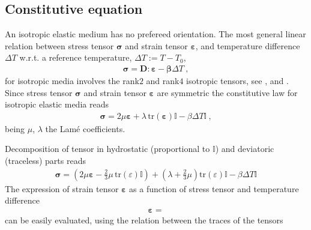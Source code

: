 \documentclass[letterpaper,10pt,english]{jupyterBook}
\begin{document}
\subsection{Constitutive equation}
\label{\detokenize{ch/solids/small-displacements-statics:constitutive-equation}}\label{\detokenize{ch/solids/small-displacements-statics:solid-mechanics-intro-small-displacements-statics-elastic-medium-constitutive-equation}}
\sphinxAtStartPar
An isotropic elastic medium has no prefereed orientation. The most general linear relation between stress tensor \(\symbf{\sigma}\) and strain tensor \(\symbf{\varepsilon}\), and temperature difference \(\Delta T\) w.r.t. a reference temperature, \(\Delta T := T - T_0\),
\begin{equation*}
\begin{split}\symbf{\sigma} = \mathbf{D} : \symbf{\varepsilon} - \symbf{\beta} \Delta T \ ,\end{split}
\end{equation*}
\sphinxAtStartPar
for isotropic media involves the rank\sphinxhyphen{}\(2\) and rank\sphinxhyphen{}\(4\) isotropic tensors, see , and . Since stress tensor \(\symbf{\sigma}\) and strain tensor \(\symbf{\varepsilon}\) are symmetric the constitutive law for isotropic elastic media reads
\begin{equation}\label{equation:ch/solids/small-displacements-statics:eq:linear-isotropic-elastic}
\begin{split}\symbf{\sigma} = 2 \mu \symbf{\varepsilon} + \lambda \, \text{tr}(\symbf{\varepsilon}) \mathbb{I} - \beta \Delta T \mathbb{I} \ ,\end{split}
\end{equation}
\sphinxAtStartPar
being \(\mu\), \(\lambda\) the Lamé coefficients.

\sphinxAtStartPar
Decomposition of tensor in hydrostatic (proportional to \(\mathbb{I}\)) and deviatoric (traceless) parts reads
\begin{equation}\label{equation:ch/solids/small-displacements-statics:eq:linear-isotropic-elastic:iso-dev}
\begin{split}\symbf{\sigma} = \left( 2 \mu \symbf{\varepsilon} - \frac{2}{3} \mu \, \text{tr}(\varepsilon) \mathbb{I} \right) + \left( \lambda + \frac{2}{3} \mu \right)\text{tr}(\varepsilon) \mathbb{I} - \beta \Delta T \mathbb{I} \end{split}
\end{equation}
\sphinxAtStartPar
The expression of strain tensor \(\symbf{\varepsilon}\) as a function of stress tensor and temperature difference
\begin{equation*}
\begin{split}\symbf{\varepsilon} = \end{split}
\end{equation*}
\sphinxAtStartPar
can be easily evaluated, using the relation between the traces of the tensors
\end{document}
